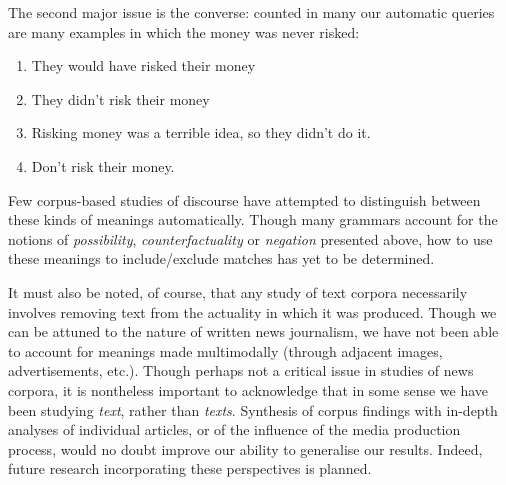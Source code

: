         The second major issue is the converse: counted in many our automatic queries are many examples in which the money was never risked:

        \begin{enumerate} [before=\itshape,font=\normalfont] \setlength\itemsep{0em} \small
            \item They would have risked their money
            \item They didn't risk their money
            \item Risking money was a terrible idea, so they didn't do it.
            \item Don't risk their money.
        \end{enumerate}
        Few corpus-based studies of discourse have attempted to distinguish between these kinds of meanings automatically. Though many grammars account for the notions of \emph{possibility}, \emph{counterfactuality} or \emph{negation} presented above, how to use these meanings to include\slash exclude matches has yet to be determined.

        It must also be noted, of course, that any study of text corpora necessarily involves removing text from the actuality in which it was produced. Though we can be attuned to the nature of written news journalism, we have not been able to account for meanings made multimodally (through adjacent images, advertisements, etc.). Though perhaps not a critical issue in studies of news corpora, it is nontheless important to acknowledge that in some sense we have been studying \emph{text}, rather than \emph{texts}. Synthesis of corpus findings with in-depth analyses of individual articles, or of the influence of the media production process, would no doubt improve our ability to generalise our results. Indeed, future research incorporating these perspectives is planned.



